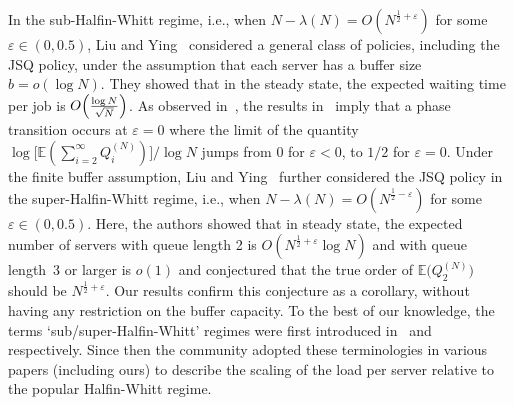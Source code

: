 \documentclass[11pt, reqno]{article}
\DeclarePairedDelimiter\autobracket{(}{)}
\newcommand{\br}[1]{\autobracket*{#1}}
\numberwithin{equation}{section}
\numberwithin{theorem}{section}
\newcommand\blue[1]{#1}
\newcommand{\E}{\mathbb{E}}                 %
\begin{document}
In the sub-Halfin-Whitt regime, i.e., when $N-\lambda(N) = O(N^{\frac{1}{2} + \varepsilon})$ for some $\varepsilon\in (0, 0.5)$, Liu and Ying~\cite{LY19} considered a general class of policies, including the JSQ policy, under the assumption that each server has a buffer size $b=o(\log N)$. 
They showed that in the steady state, the expected waiting time per job is $O\br{\frac{\log N}{\sqrt{N}}}$. 
As observed in~\cite{LY19}, the results in~\cite{EG15, Braverman18, LY19} imply that a phase transition occurs at $\varepsilon = 0$ where the limit of the quantity 
$\log\big[\E(\sum_{i=2}^\infty Q_i^{(N)})\big]/\log N$
jumps from 0 for $\varepsilon<0$, to $1/2$ for $\varepsilon = 0$.
Under the finite buffer assumption, Liu and Ying~\cite{LY21} further considered the JSQ policy in the super-Halfin-Whitt regime, i.e., when $N-\lambda(N) = O(N^{\frac{1}{2} - \varepsilon})$ for some $\varepsilon\in (0, 0.5)$. 
Here, the authors showed that in steady state, the expected number of servers with queue length 2 is $O(N^{\frac{1}{2}+\varepsilon}\log N)$ and with queue length~3 or larger is $o(1)$ and
conjectured that the true order of $\E\big(Q_2^{(N)}\big)$ should be $N^{\frac{1}{2}+\varepsilon}$. 
Our results confirm this conjecture as a corollary, without having any restriction on the buffer capacity.
\blue{To the best of our knowledge, the terms `sub/super-Halfin-Whitt' regimes were first introduced in~\cite{LY19} and~\cite{LY21} respectively. 
Since then the community adopted these terminologies in various papers (including ours) to describe the scaling of the load per server relative to the popular Halfin-Whitt regime. }
\end{document}
